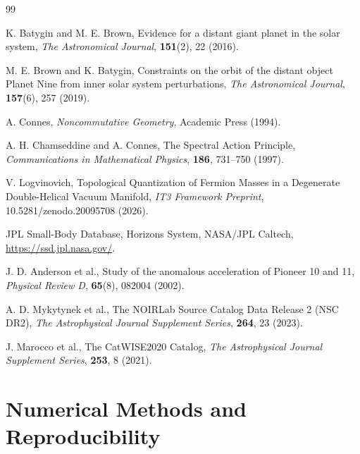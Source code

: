 \documentclass[11pt,a4paper]{article}
\theoremstyle{remark}
\begin{document}
\begin{thebibliography}{99}

K. Batygin and M. E. Brown,
\newblock Evidence for a distant giant planet in the solar system,
\newblock \emph{The Astronomical Journal}, \textbf{151}(2), 22 (2016).

M. E. Brown and K. Batygin,
\newblock Constraints on the orbit of the distant object Planet Nine from inner solar system perturbations,
\newblock \emph{The Astronomical Journal}, \textbf{157}(6), 257 (2019).

A. Connes,
\newblock \emph{Noncommutative Geometry},
\newblock Academic Press (1994).

A. H. Chamseddine and A. Connes,
\newblock The Spectral Action Principle,
\newblock \emph{Communications in Mathematical Physics}, \textbf{186}, 731--750 (1997).

V. Logvinovich,
\newblock Topological Quantization of Fermion Masses in a Degenerate Double-Helical Vacuum Manifold,
\newblock \emph{IT3 Framework Preprint}, 10.5281/zenodo.20095708 (2026).

JPL Small-Body Database,
\newblock Horizons System, NASA/JPL Caltech,
\newblock \url{https://ssd.jpl.nasa.gov/}.

J. D. Anderson et al.,
\newblock Study of the anomalous acceleration of Pioneer 10 and 11,
\newblock \emph{Physical Review D}, \textbf{65}(8), 082004 (2002).

A. D. Mykytynek et al.,
\newblock The NOIRLab Source Catalog Data Release 2 (NSC DR2),
\newblock \emph{The Astrophysical Journal Supplement Series}, \textbf{264}, 23 (2023).

J. Marocco et al.,
\newblock The CatWISE2020 Catalog,
\newblock \emph{The Astrophysical Journal Supplement Series}, \textbf{253}, 8 (2021).

\end{thebibliography}

\appendix
\section{Numerical Methods and Reproducibility}
\end{document}
